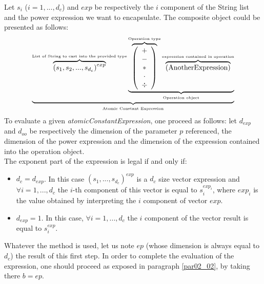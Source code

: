 \documentclass[11pt]{amsart}
\begin{document}
Let $s_i$ ($i=1,...,d_c$) and $exp$ be respectively the $i$ component of the String list and the power expression we want to encapsulate. The composite object could be presented as follows:
\begin{equation}
 \underbrace{    \overbrace{ \left( s_1  , s_2, ..., s_{d_c}\right)^{exp} }^{\mbox{\tiny List of String  to cast into the provided type}}   \underbrace{  \overbrace{\left( \begin{array}{c} + \\ - \\ \ast  \\ \cdot \\ \div   \end{array} \right) }^{\mbox{\tiny Operation type}}
 \overbrace{    \left( \mbox{AnotherExpression}\right) }^{\mbox{\tiny expression contained in operation}}   }_{\mbox{\tiny Operation object}}}_{\mbox{\tiny Atomic Constant Expression}}
\end{equation}
To evaluate a given {\it atomicConstantExpression}, one proceed as follows: let $d_{exp}$ and $d_{oo}$ be respectively the dimension of the parameter $p$ referenced, the dimension of the power expression and the dimension of the expression contained into the operation object.\\
The exponent part of the expression is legal if and only if:
\begin{itemize}
\item $d_c = d_{exp}$. In this case $(s_1,...,s_{d_c})^{exp}$ is a $d_c$ size vector expression and $\forall i =1,...,d_c$ the $i$-th component of this vector is equal to $s_i^{exp_i}$, where $exp_i$ is the value obtained by interpreting the $i$ component of vector $exp$.
\item $d_{exp}=1$. In this case, $\forall i =1,...,d_c$ the $i$ component of the vector result is equal to $s_i^{exp}$.\\
\end{itemize}
Whatever the method is used, let us note $ep$ (whose dimension is always equal to $d_c$) the result of 
this first step.  In order to complete the evaluation of the expression, one should proceed as exposed in paragraph \ref{par02_02}, by taking there $b=ep$.
\end{document}
